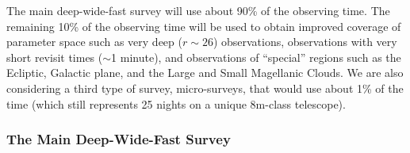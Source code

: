 \documentclass{emulateapj}
\begin{document}
The main deep-wide-fast survey %
will use about 90\% of the observing time. The remaining 10\% of the observing 
time will be used to obtain improved coverage of parameter space such as 
very deep ($r\sim26$) observations, observations with very short revisit 
times ($\sim$1 minute), and observations of ``special'' regions such as the 
Ecliptic, Galactic plane, and the Large and Small Magellanic Clouds. 
We are also considering a third type of survey, micro-surveys, that would 
use about 1\% of the time (which still represents 25 nights on a unique 
8m-class telescope). 

\subsubsection{ The Main Deep-Wide-Fast Survey }
\end{document}
